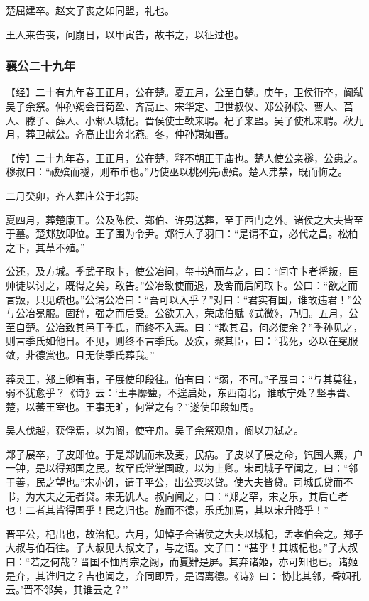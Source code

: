 \documentclass[]{article}
\begin{document}
楚屈建卒。赵文子丧之如同盟，礼也。

王人来告丧，问崩日，以甲寅告，故书之，以征过也。

\hypertarget{header-n2274}{%
\subsubsection{襄公二十九年}\label{header-n2274}}

【经】二十有九年春王正月，公在楚。夏五月，公至自楚。庚午，卫侯衎卒，阍弑吴子余祭。仲孙羯会晋荀盈、齐高止、宋华定、卫世叔仪、郑公孙段、曹人、莒人、滕子、薛人、小邾人城杞。晋侯使士鞅来聘。杞子来盟。吴子使札来聘。秋九月，葬卫献公。齐高止出奔北燕。冬，仲孙羯如晋。

【传】二十九年春，王正月，公在楚，释不朝正于庙也。楚人使公亲襚，公患之。穆叔曰：``祓殡而襚，则布币也。''乃使巫以桃列先祓殡。楚人弗禁，既而悔之。

二月癸卯，齐人葬庄公于北郭。

夏四月，葬楚康王。公及陈侯、郑伯、许男送葬，至于西门之外。诸侯之大夫皆至于墓。楚郏敖即位。王子围为令尹。郑行人子羽曰：``是谓不宜，必代之昌。松柏之下，其草不殖。''

公还，及方城。季武子取卞，使公冶问，玺书追而与之，曰：``闻守卞者将叛，臣帅徒以讨之，既得之矣，敢告。''公冶致使而退，及舍而后闻取卞。公曰：``欲之而言叛，只见疏也。''公谓公冶曰：``吾可以入乎？''对曰：``君实有国，谁敢违君！''公与公冶冕服。固辞，强之而后受。公欲无入，荣成伯赋《式微》，乃归。五月，公至自楚。公冶致其邑于季氏，而终不入焉。曰：``欺其君，何必使余？''季孙见之，则言季氏如他日。不见，则终不言季氏。及疾，聚其臣，曰：``我死，必以在冕服敛，非德赏也。且无使季氏葬我。''

葬灵王，郑上卿有事，子展使印段往。伯有曰：``弱，不可。''子展曰：``与其莫往，弱不犹愈乎？《诗》云：`王事靡盬，不遑启处，东西南北，谁敢宁处？坚事晋、楚，以蕃王室也。王事无旷，何常之有？''遂使印段如周。

吴人伐越，获俘焉，以为阍，使守舟。吴子余祭观舟，阍以刀弑之。

郑子展卒，子皮即位。于是郑饥而未及麦，民病。子皮以子展之命，饩国人粟，户一钟，是以得郑国之民。故罕氏常掌国政，以为上卿。宋司城子罕闻之，曰：``邻于善，民之望也。''宋亦饥，请于平公，出公粟以贷。使大夫皆贷。司城氏贷而不书，为大夫之无者贷。宋无饥人。叔向闻之，曰：``郑之罕，宋之乐，其后亡者也！二者其皆得国乎！民之归也。施而不德，乐氏加焉，其以宋升降乎！''

晋平公，杞出也，故治杞。六月，知悼子合诸侯之大夫以城杞，孟孝伯会之。郑子大叔与伯石往。子大叔见大叔文子，与之语。文子曰：``甚乎！其城杞也。''子大叔曰：``若之何哉？晋国不恤周宗之阙，而夏肄是屏。其弃诸姬，亦可知也已。诸姬是弃，其谁归之？吉也闻之，弃同即异，是谓离德。《诗》曰：`协比其邻，昏姻孔云。'晋不邻矣，其谁云之？''
\end{document}
